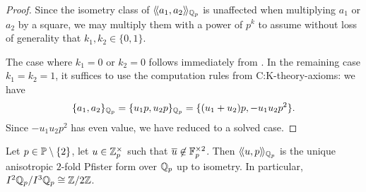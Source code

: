 \documentclass[12pt, leqno, british]{amsart}
\begin{document}
\begin{proof}
Since the isometry class of $\langle\!\langle a_1, a_2 \rangle\!\rangle_{\mathbb Q_p}$ is unaffected when multiplying $a_1$ or $a_2$ by a square, we may multiply them with a power of $p^k$ to assume without loss of generality that $k_1, k_2 \in \lbrace 0, 1 \rbrace$.

The case where $k_1 = 0$ or $k_2 = 0$ follows immediately from .
In the remaining case $k_1 = k_2 = 1$, it suffices to use the computation rules from {C:K-theory-axioms}: we have
$$ \lbrace a_1, a_2 \rbrace_{\mathbb Q_p} = \lbrace u_1p, u_2p \rbrace_{\mathbb Q_p} = \lbrace (u_1+u_2)p, -u_1u_2p^2\rbrace.$$
Since $-u_1u_2p^2$ has even value, we have reduced to a solved case.
\end{proof}
\begin{cor}\label{C:unique-2-fold-Pfister-qqp-odd}
Let $p \in \mathbb P \setminus \lbrace 2 \rbrace$, let $u \in \mathbb Z_p^\times$ such that $\overline{u} \not\in \mathbb F_p^{\times 2}$.
Then $\langle\!\langle u, p \rangle\!\rangle_{\mathbb Q_p}$ is the unique anisotropic $2$-fold Pfister form over $\mathbb Q_p$ up to isometry.
In particular, $I^2\mathbb Q_p/I^3\mathbb Q_p \cong \mathbb Z/2\mathbb Z$.
\end{cor}
\end{document}
